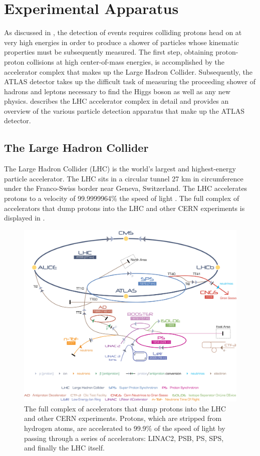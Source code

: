 \section{Experimental Apparatus}
\label{sec:experiment}

As discussed in , the detection of \HToZg events requires
colliding protons head on at very high energies in order to produce a shower
of particles whose kinematic properties must be subsequently measured.
The first step, obtaining proton-proton collisions at high center-of-mass energies,
is accomplished by the accelerator complex that makes up the Large Hadron Collider.
Subsequently, the ATLAS detector takes up the difficult task of measuring
the proceeding shower of hadrons and leptons necessary to find the Higgs boson
as well as any new physics.
 describes the LHC accelerator
complex in detail and  provides an overview of the various
particle detection apparatus that make up the ATLAS detector.

\subsection{The Large Hadron Collider}
\label{subsec:lhc}
The Large Hadron Collider (LHC) is the world's largest and highest-energy particle
accelerator. The LHC sits in a circular tunnel 27 km in circumference under
the Franco-Swiss border near Geneva, Switzerland. The LHC accelerates protons
to a velocity of 99.9999964\% the speed of light \cite{LHCdesign}. The full
complex of accelerators that dump protons into the LHC and other CERN 
experiments is displayed in .

\begin{figure}
  \centering
  \includegraphics[scale=0.5, angle=0]{figures/Cern-Accelerator-Complex}
    \caption{The full complex of accelerators that dump protons into the LHC
    and other CERN experiments. Protons, which are stripped from hydrogen atoms,
    are accelerated to 99.9\% of the speed of light by passing through a series
    of accelerators: LINAC2, PSB, PS, SPS, and finally the LHC itself.}
  \label{fig:accelerator}
\end{figure}

